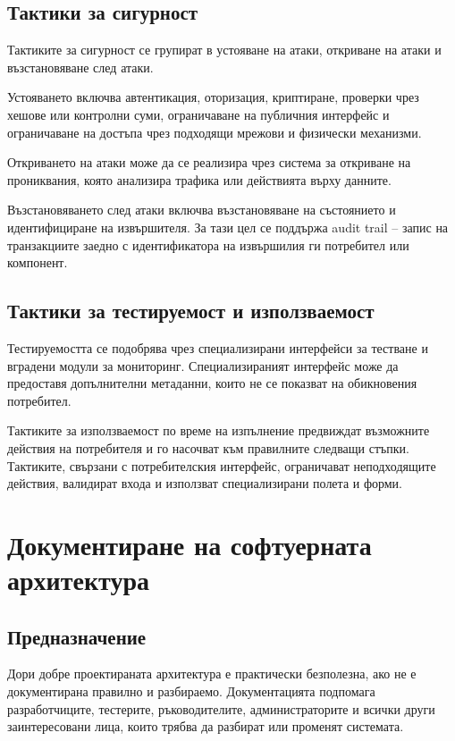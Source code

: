 \subsection{Тактики за сигурност}\label{s:27.7.4}

Тактиките за сигурност се групират в устояване на атаки, откриване на атаки и възстановяване след атаки.

Устояването включва автентикация, оторизация, криптиране, проверки чрез хешове или контролни суми, ограничаване на публичния интерфейс и ограничаване на достъпа чрез подходящи мрежови и физически механизми.

Откриването на атаки може да се реализира чрез система за откриване на прониквания, която анализира трафика или действията върху данните.

Възстановяването след атаки включва възстановяване на състоянието и идентифициране на извършителя. За тази цел се поддържа audit trail -- запис на транзакциите заедно с идентификатора на извършилия ги потребител или компонент.

\subsection{Тактики за тестируемост и използваемост}\label{s:27.7.5}

Тестируемостта се подобрява чрез специализирани интерфейси за тестване и вградени модули за мониторинг. Специализираният интерфейс може да предоставя допълнителни метаданни, които не се показват на обикновения потребител.

Тактиките за използваемост по време на изпълнение предвиждат възможните действия на потребителя и го насочват към правилните следващи стъпки. Тактиките, свързани с потребителския интерфейс, ограничават неподходящите действия, валидират входа и използват специализирани полета и форми.

\section{Документиране на софтуерната архитектура}\label{s:27.8}

\subsection{Предназначение}\label{s:27.8.1}

Дори добре проектираната архитектура е практически безполезна, ако не е документирана правилно и разбираемо. Документацията подпомага разработчиците, тестерите, ръководителите, администраторите и всички други заинтересовани лица, които трябва да разбират или променят системата.

